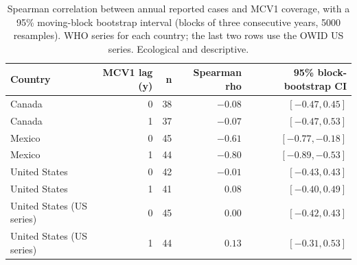 \begin{table}[htbp]
\centering
\small
\caption{Spearman correlation between annual reported cases and MCV1 coverage, with a 95\% moving-block bootstrap interval (blocks of three consecutive years, 5000 resamples). WHO series for each country; the last two rows use the OWID US series. Ecological and descriptive.}
\label{tab:assoc}
\begin{tabular}{lrrrr}
\toprule
Country & MCV1 lag (y) & n & Spearman rho & 95\% block-bootstrap CI \\
\midrule
Canada & 0 & 38 & $-0.08$ & $[-0.47, 0.45]$ \\
Canada & 1 & 37 & $-0.07$ & $[-0.47, 0.53]$ \\
Mexico & 0 & 45 & $-0.61$ & $[-0.77, -0.18]$ \\
Mexico & 1 & 44 & $-0.80$ & $[-0.89, -0.53]$ \\
United States & 0 & 42 & $-0.01$ & $[-0.43, 0.43]$ \\
United States & 1 & 41 & $0.08$ & $[-0.40, 0.49]$ \\
United States (US series) & 0 & 45 & $0.00$ & $[-0.42, 0.43]$ \\
United States (US series) & 1 & 44 & $0.13$ & $[-0.31, 0.53]$ \\
\bottomrule
\end{tabular}
\end{table}
